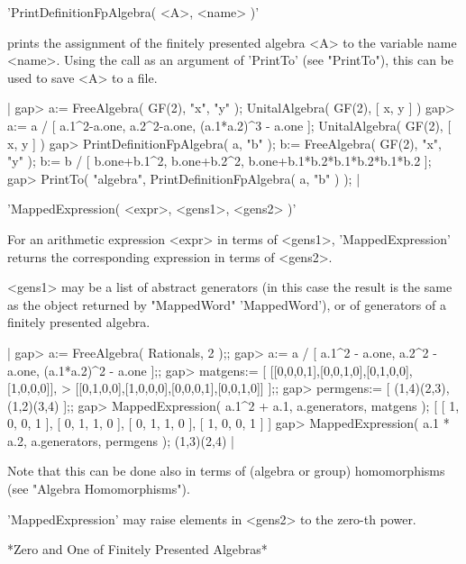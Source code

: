 
'PrintDefinitionFpAlgebra( <A>, <name> )'

prints the assignment of the finitely presented algebra <A> to the variable
name <name>.  Using the call as an argument of 'PrintTo' (see "PrintTo"),
this can be used to save <A> to a file.

|    gap> a:= FreeAlgebra( GF(2), "x", "y" );
    UnitalAlgebra( GF(2), [ x, y ] )
    gap> a:= a / [ a.1^2-a.one, a.2^2-a.one, (a.1*a.2)^3 - a.one ];
    UnitalAlgebra( GF(2), [ x, y ] )
    gap> PrintDefinitionFpAlgebra( a, "b" );
    b:= FreeAlgebra( GF(2), "x", "y" );
    b:= b / [ b.one+b.1^2, b.one+b.2^2, b.one+b.1*b.2*b.1*b.2*b.1*b.2 ];
    gap> PrintTo( "algebra", PrintDefinitionFpAlgebra( a, "b" ) ); |


'MappedExpression( <expr>, <gens1>, <gens2> )'

For an arithmetic expression <expr> in terms of <gens1>,
'MappedExpression' returns the corresponding expression in terms of 
<gens2>.

<gens1> may be a list of abstract generators (in this case the result is the
same as the object returned by "MappedWord" 'MappedWord'), or of generators
of a finitely presented algebra.

|    gap> a:= FreeAlgebra( Rationals, 2 );;
    gap> a:= a / [ a.1^2 - a.one, a.2^2 - a.one, (a.1*a.2)^2 - a.one ];;
    gap> matgens:= [ [[0,0,0,1],[0,0,1,0],[0,1,0,0],[1,0,0,0]],
    >                [[0,1,0,0],[1,0,0,0],[0,0,0,1],[0,0,1,0]] ];;
    gap> permgens:= [ (1,4)(2,3), (1,2)(3,4) ];;
    gap> MappedExpression( a.1^2 + a.1, a.generators, matgens );
    [ [ 1, 0, 0, 1 ], [ 0, 1, 1, 0 ], [ 0, 1, 1, 0 ], [ 1, 0, 0, 1 ] ]
    gap> MappedExpression( a.1 * a.2, a.generators, permgens );
    (1,3)(2,4) |

Note that this can be done also in terms of (algebra or group) homomorphisms
(see "Algebra Homomorphisms").

'MappedExpression' may raise elements in <gens2> to the zero-th power.

%

*Zero and One of Finitely Presented Algebras*


